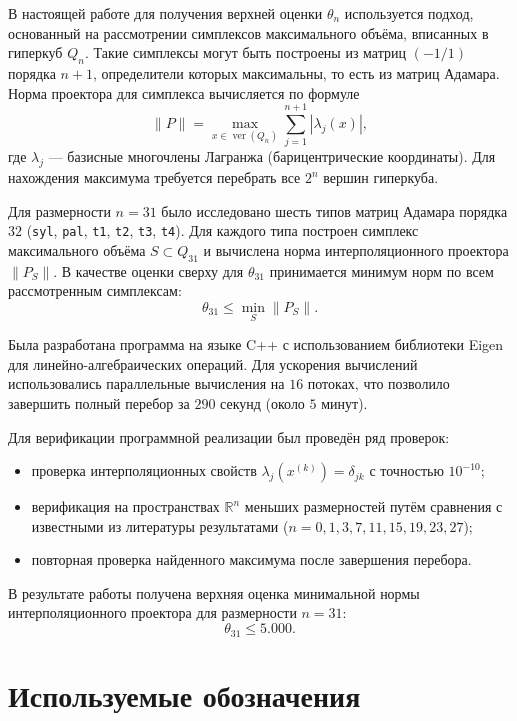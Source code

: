 \documentclass[a4paper,12pt]{article}
\theoremstyle{indented}
\begin{document}
В настоящей работе для получения верхней оценки $\theta_n$ используется подход, основанный на рассмотрении симплексов максимального объёма, вписанных в гиперкуб $Q_n$. Такие симплексы могут быть построены из матриц $(-1/1)$ порядка $n+1$, определители которых максимальны, то есть из матриц Адамара. Норма проектора для симплекса вычисляется по формуле
\[
\|P\| = \max_{x \in \operatorname{ver}(Q_n)} \sum_{j=1}^{n+1} |\lambda_j(x)|,
\]
где $\lambda_j$ — базисные многочлены Лагранжа (барицентрические координаты). Для нахождения максимума требуется перебрать все $2^n$ вершин гиперкуба.
\par
Для размерности $n = 31$ было исследовано шесть типов матриц Адамара порядка $32$ (\texttt{syl}, \texttt{pal}, \texttt{t1}, \texttt{t2}, \texttt{t3}, \texttt{t4}). Для каждого типа построен симплекс максимального объёма $S \subset Q_{31}$ и вычислена норма интерполяционного проектора $\|P_S\|$. В качестве оценки сверху для $\theta_{31}$ принимается минимум норм по всем рассмотренным симплексам:
\[
\theta_{31} \le \min_{S} \|P_S\|.
\]
\par
Была разработана программа на языке C++ с использованием библиотеки Eigen для линейно-алгебраических операций. Для ускорения вычислений использовались параллельные вычисления на $16$ потоках, что позволило завершить полный перебор за $290$ секунд (около $5$ минут).
\par
Для верификации программной реализации был проведён ряд проверок:
\begin{itemize}
    \item проверка интерполяционных свойств $\lambda_j(x^{(k)}) = \delta_{jk}$ с точностью $10^{-10}$;
    \item верификация на пространствах $\mathbb{R}^n$ меньших размерностей путём сравнения с известными из литературы результатами ($n = 0, 1, 3, 7, 11, 15, 19, 23, 27$);
    \item повторная проверка найденного максимума после завершения перебора.
\end{itemize}

В результате работы получена верхняя оценка минимальной нормы интерполяционного проектора для размерности $n = 31$:
\[
\theta_{31} \le 5.000.
\]

\newpage

\section{Используемые обозначения}
\end{document}
